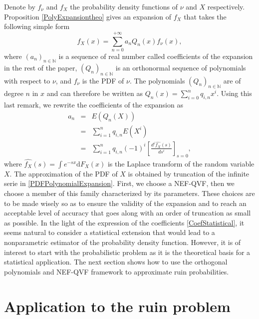 Denote by $f_{\nu}$ and $f_{X}$ the probability density functions of $\nu$ and $X$ respectively. Proposition \ref{PolyExpansiontheo} gives an expansion of $f_{X}$ that takes the following simple form
\begin{equation}\label{PDFPolynomialExpansion}
f_{X}(x)=\sum^{+\infty}_{n=0}a_{n}Q_{n}(x)f_{\nu}(x),
\end{equation} 
where $(a_{n})_{n\in\mathbb{N}}$ is a sequence of real number called coefficients of the expansion in the rest of the paper, $(Q_{n})_{n\in\mathbb{N}}$ is an orthonormal sequence of polynomials with respect to $\nu$, and $f_{\nu}$ is the PDF of $\nu$. The polynomials $(Q_{n})_{n\in\mathbb{N}}$ are of degree $n$ in $x$ and can therefore be written as $Q_{n}(x)=\sum^{n}_{i=0} q_{i,n}x^{i}$. Using this last remark, we rewrite the coefficients of the expansion as 
\begin{eqnarray}
a_{n}&=&E(Q_{n}(X))\nonumber\\
&=&\sum_{i=1}^{n}q_{i,n}E\left(X^{i}\right)\label{CoefStatistical}\\
&=&\sum_{i=1}^{n}q_{i,n}(-1)^{i}\left[\frac{d^{i}\widehat{f_{X}}(s)}{ds^{i}}\right]_{s=0}\nonumber,
\end{eqnarray} 
where $\widehat{f_{X}}(s)=\int e^{-sx}\text{d}F_{X}(x)$ is the Laplace transform of the random variable $X$. The approximation of the PDF of $X$ is obtained by truncation of the infinite serie in \eqref{PDFPolynomialExpansion}. First, we choose a NEF-QVF, then we choose a member of this family characterized by its parameters. These choices are to be made wisely so as to ensure the validity of the expansion and to reach an acceptable level of accuracy that goes along with an order of truncation as small as possible. In the light of the expression of the coefficients \eqref{CoefStatistical}, it seems natural to consider a statistical extension that would lead to a nonparametric estimator of the probability density function. However, it is of interest to start with the probabilistic problem as it is the theoretical basis for a statistical application. The next section shows how to use the orthogonal polynomials and NEF-QVF framework to approximate ruin probabilities. 
\section{Application to the ruin problem}
